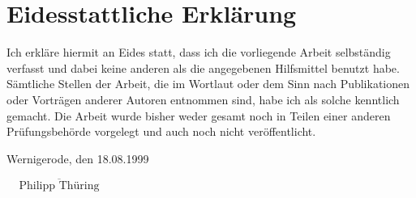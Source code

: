 \section*{Eidesstattliche Erklärung}
\vspace{10mm}

Ich erkläre hiermit an Eides statt, dass ich die vorliegende Arbeit selbständig verfasst und dabei 
keine anderen als die angegebenen Hilfsmittel benutzt habe. Sämtliche Stellen der Arbeit, die im 
Wortlaut oder dem Sinn nach Publikationen oder Vorträgen anderer Autoren entnommen sind, habe ich 
als solche kenntlich gemacht. Die Arbeit wurde bisher weder gesamt noch in Teilen einer anderen 
Prüfungsbehörde vorgelegt und auch noch nicht veröffentlicht.

\vspace{10mm}

Wernigerode, den 18.08.1999


\begin{flushright}
    $ \overline{ ~~~~~\mbox{Philipp Thüring} ~~~~~} $ 
\end{flushright}
